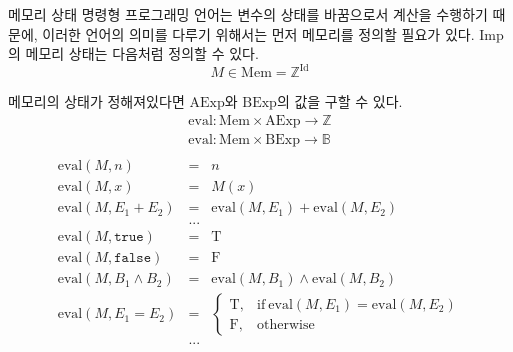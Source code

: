 \documentclass[10pt]{beamer}
\newcommand{\Id}[0]{\mathrm{Id}}
\newcommand{\AExp}[0]{\mathrm{AExp}}
\newcommand{\BExp}[0]{\mathrm{BExp}}
\newcommand{\true}[0]{\texttt{true}}
\newcommand{\false}[0]{\texttt{false}}
\newcommand{\Mem}[0]{\mathrm{Mem}}
\newcommand{\True}[0]{\mathrm{T}}
\newcommand{\False}[0]{\mathrm{F}}
\newcommand{\eval}[0]{\mathrm{eval}}
\begin{document}
\begin{frame}{메모리 상태}
   {
    명령형 프로그래밍 언어는 변수의 상태를 바꿈으로서 계산을 수행하기 때문에,
    이러한 언어의 의미를 다루기 위해서는 먼저 메모리를 정의할 필요가 있다.
    Imp의 메모리 상태는 다음처럼 정의할 수 있다.
    \[ M \in \Mem = \mathbb{Z}^{\Id} \]
  }

   {
    메모리의 상태가 정해져있다면 \(\AExp\)와 \(\BExp\)의 값을 구할 수 있다.
    \[
      \begin{array}{l}
        \eval : \Mem \times \AExp \to \mathbb{Z} \\
        \eval : \Mem \times \BExp \to \mathbb{B} \\
      \end{array}
    \]
    \[
      \begin{array}{rcl}
        \eval(M,n) &=& n \\
        \eval(M,x) &=& M(x) \\
        \eval(M,E_1 + E_2) &=& \eval(M,E_1) + \eval(M,E_2) \\
        & ... & \\
        \eval(M,\true) &=& \True \\
        \eval(M,\false) &=& \False \\
        \eval(M,B_1 \wedge B_2) &=& \eval(M,B_1) \wedge \eval(M,B_2) \\
        \eval(M,E_1 = E_2) &=&
        \begin{cases}
          \True, & \text{if}\ \eval(M,E_1) = \eval(M,E_2) \\
          \False, & \text{otherwise}
        \end{cases}
        \\
        & ... &
      \end{array}
    \]
  }
\end{frame}
\end{document}
